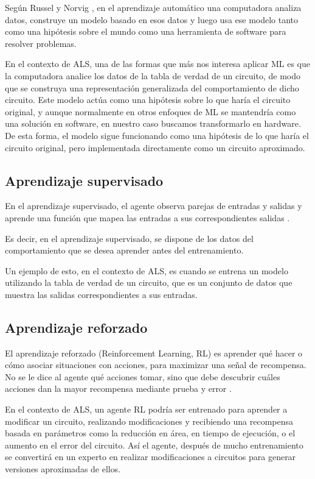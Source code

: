Según Russel y Norvig \cite{russell2016artificial}, en el aprendizaje
automático una computadora analiza datos, construye un modelo basado en esos
datos y luego usa ese modelo tanto como una hipótesis sobre el mundo como una
herramienta de software para resolver problemas.

En el contexto de ALS, una de las formas que más nos interesa aplicar ML es
que la computadora analice los datos de la tabla de verdad de un circuito,
de modo que se construya una representación generalizada del comportamiento de
dicho circuito.
Este modelo actúa como una hipótesis sobre lo que haría el circuito original, y
aunque normalmente en otros enfoques de ML se mantendría como una solución en
software, en nuestro caso buscamos transformarlo en hardware. De esta forma, el
modelo sigue funcionando como una hipótesis de lo que haría el circuito
original, pero implementada directamente como un circuito aproximado.

\subsection{Aprendizaje supervisado}

En el aprendizaje supervisado, el agente observa parejas de entradas y salidas
y aprende una función que mapea las entradas a sus correspondientes salidas
\cite{russell2016artificial}.

Es decir, en el aprendizaje supervisado, se dispone de los datos del
comportamiento que se desea aprender antes del entrenamiento.

Un ejemplo de esto, en el contexto de ALS, es cuando se entrena un modelo
utilizando la tabla de verdad de un circuito, que es un conjunto de datos que
muestra las salidas correspondientes a sus entradas.

\subsection{Aprendizaje reforzado}

El aprendizaje reforzado (Reinforcement Learning, RL) es aprender qué hacer o
cómo asociar situaciones con acciones, para maximizar una señal de recompensa.
No se le dice al agente qué acciones tomar, sino que debe descubrir cuáles
acciones dan la mayor recompensa mediante prueba y error \cite{sutton_reinforcement_2018}.

En el contexto de ALS, un agente RL podría ser entrenado para aprender a
modificar un circuito, realizando modificaciones y recibiendo una recompensa
basada en parámetros como la reducción en área, en tiempo de ejecución, o el
aumento en el error del circuito. Así el agente, después de mucho entrenamiento
se convertirá en un experto en realizar modificaciones a circuitos para generar
versiones aproximadas de ellos.

